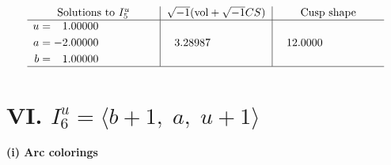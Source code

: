 \documentclass[1p]{elsarticle_modified}
\theoremstyle{definition}
\newcommand{\I}{\sqrt{-1}}
\begin{document}
$$\begin{array}{c|c|c}  
\text{Solutions to }I^u_{5}& \I (\text{vol} + \sqrt{-1}CS) & \text{Cusp shape}\\
 \hline 
\begin{aligned}
u &= \phantom{-}1.00000\phantom{ +0.000000I} \\
a &= -2.00000\phantom{ +0.000000I} \\
b &= \phantom{-}1.00000\phantom{ +0.000000I}\end{aligned}
 & \phantom{-}3.28987\phantom{ +0.000000I} & \phantom{-}12.0000\phantom{ +0.000000I}\\
 \hline 
 \end{array}$$\newpage\newpage\renewcommand{\arraystretch}{1}
\centering \section*{VI. $I^u_{6}= \langle b+1,\;a,\;u+1 \rangle$}
\flushleft \textbf{(i) Arc colorings}\\
\end{document}
